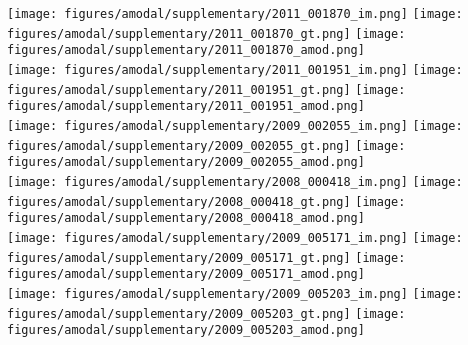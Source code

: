\begin{figure*}
\centering\texttt{[image: figures/amodal/supplementary/2011\_001870\_im.png]}
\texttt{[image: figures/amodal/supplementary/2011\_001870\_gt.png]}
\texttt{[image: figures/amodal/supplementary/2011\_001870\_amod.png]} \\ 
\texttt{[image: figures/amodal/supplementary/2011\_001951\_im.png]}
\texttt{[image: figures/amodal/supplementary/2011\_001951\_gt.png]}
\texttt{[image: figures/amodal/supplementary/2011\_001951\_amod.png]} \\ 
\texttt{[image: figures/amodal/supplementary/2009\_002055\_im.png]}
\texttt{[image: figures/amodal/supplementary/2009\_002055\_gt.png]}
\texttt{[image: figures/amodal/supplementary/2009\_002055\_amod.png]} \\ 
\texttt{[image: figures/amodal/supplementary/2008\_000418\_im.png]}
\texttt{[image: figures/amodal/supplementary/2008\_000418\_gt.png]}
\texttt{[image: figures/amodal/supplementary/2008\_000418\_amod.png]} \\ 
\texttt{[image: figures/amodal/supplementary/2009\_005171\_im.png]}
\texttt{[image: figures/amodal/supplementary/2009\_005171\_gt.png]}
\texttt{[image: figures/amodal/supplementary/2009\_005171\_amod.png]} \\ 
\texttt{[image: figures/amodal/supplementary/2009\_005203\_im.png]}
\texttt{[image: figures/amodal/supplementary/2009\_005203\_gt.png]}
\texttt{[image: figures/amodal/supplementary/2009\_005203\_amod.png]} \\ 
\end{figure*}
